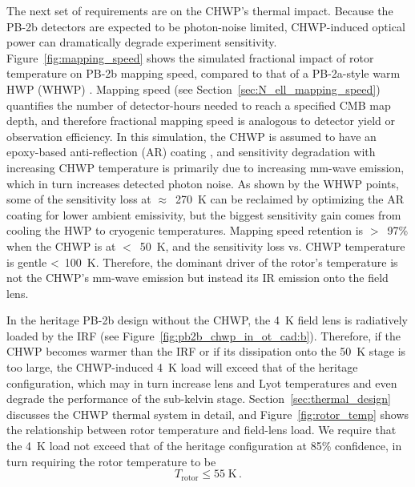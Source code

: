 The next set of requirements are on the CHWP's thermal impact. Because the PB-2b detectors are expected to be photon-noise limited, CHWP-induced optical power can dramatically degrade experiment sensitivity. Figure~\ref{fig:mapping_speed} shows the simulated \cite{hill_bolocalc_2018} fractional impact of rotor temperature on PB-2b mapping speed, compared to that of a PB-2a-style warm HWP (WHWP) \cite{hill_design_2016}. Mapping speed (see Section~\ref{sec:N_ell_mapping_speed}) quantifies the number of detector-hours needed to reach a specified CMB map depth, and therefore fractional mapping speed is analogous to detector yield or observation efficiency. In this simulation, the CHWP is assumed to have an epoxy-based anti-reflection (AR) coating \cite{rosen_epoxy-based_2013}, and sensitivity degradation with increasing CHWP temperature is primarily due to increasing mm-wave emission, which in turn increases detected photon noise. As shown by the WHWP points, some of the sensitivity loss at $\approx$~270~K can be reclaimed by optimizing the AR coating for lower ambient emissivity, but the biggest sensitivity gain comes from cooling the HWP to cryogenic temperatures. Mapping speed retention is $>$~97\% when the CHWP is at $<$~50~K, and the sensitivity loss vs. CHWP temperature is gentle <~100~K. Therefore, the dominant driver of the rotor's temperature is not the CHWP's mm-wave emission but instead its IR emission onto the field lens. 

In the heritage PB-2b design without the CHWP, the 4~K field lens is radiatively loaded by the IRF (see Figure~\ref{fig:pb2b_chwp_in_ot_cad:b}). Therefore, if the CHWP becomes warmer than the IRF or if its dissipation onto the 50~K stage is too large, the CHWP-induced 4~K load will exceed that of the heritage configuration, which may in turn increase lens and Lyot temperatures and even degrade the performance of the sub-kelvin stage. Section~\ref{sec:thermal_design} discusses the CHWP thermal system in detail, and Figure~\ref{fig:rotor_temp} shows the relationship between rotor temperature and field-lens load. We require that the 4~K load not exceed that of the heritage configuration at 85\% confidence, in turn requiring the rotor temperature to be
\begin{equation}
    T_{\mathrm{rotor}} \leq 55 \; \mathrm{K} \, .
    \label{eq:rotor_temp}
\end{equation}

